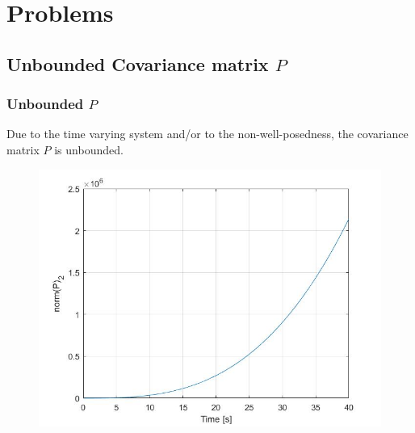 \documentclass{beamer}
\begin{document}
	
	
	
	
\section{Problems}
\subsection{Unbounded Covariance matrix $P$}
	\begin{frame}
		\frametitle{Unbounded $P$}
		Due to the time varying system and/or to the non-well-posedness, the covariance matrix $P$ is unbounded.
		\begin{figure}[H]
			\includegraphics[scale=0.3]{pric}
		\end{figure} 
	\end{frame}
\end{document}
